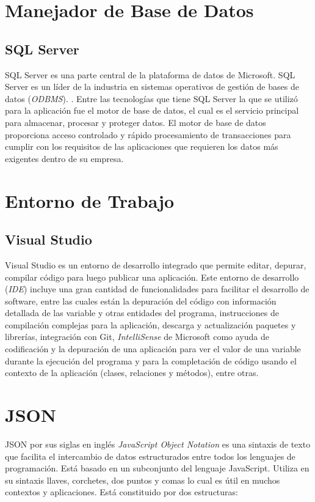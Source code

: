 \section{Manejador de Base de Datos}
\subsection{SQL Server}
SQL Server es una parte central de la plataforma de datos de Microsoft. SQL Server es un líder de la industria en sistemas operativos de gestión de bases de datos (\textit{ODBMS}). \cite{sqlServerMicrosoft}. Entre las tecnologías que tiene SQL Server la que se utilizó para la aplicación fue el motor de base de datos, el cual es el servicio principal para almacenar, procesar y proteger datos. El motor de base de datos proporciona acceso controlado y rápido procesamiento de transacciones para cumplir con los requisitos de las aplicaciones que requieren los datos más exigentes dentro de su empresa. 

\section{Entorno de Trabajo}
\subsection{Visual Studio}
Visual Studio es un entorno de desarrollo integrado que permite editar, depurar, compilar código para luego publicar una aplicación. \cite{visualStudioMicrosoft} Este entorno de desarrollo (\textit{IDE}) incluye una gran cantidad de funcionalidades para facilitar el desarrollo de software, entre las cuales están la depuración del código con información detallada de las variable y otras entidades del programa, instrucciones de compilación complejas para la aplicación, descarga y actualización paquetes y librerías, integración con Git, \textit{IntelliSense} de Microsoft como ayuda de codificación y la depuración de una aplicación para ver el valor de una variable durante la ejecución del programa y para la completación de código usando el contexto de la aplicación (clases, relaciones y métodos), entre otras.


\section{JSON}
JSON por sus siglas en inglés \textit{JavaScript Object Notation} es una sintaxis de texto que facilita el intercambio de datos estructurados entre todos los lenguajes de programación. Está basado en un subconjunto del lenguaje JavaScript. Utiliza en su sintaxis llaves, corchetes, dos puntos y comas lo cual es útil en muchos contextos y aplicaciones. \cite{json} Está constituido por dos estructuras:

